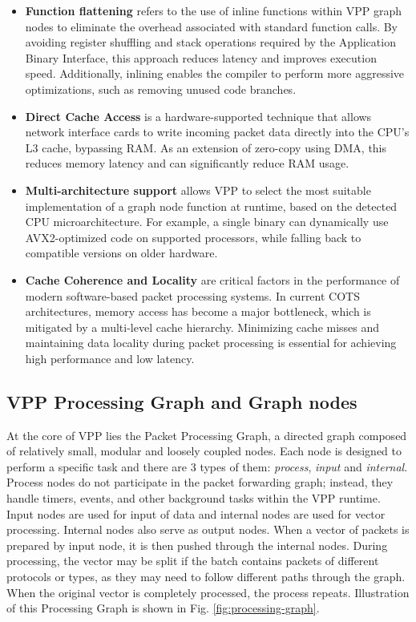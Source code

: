 \begin{itemize}
  \item \textbf{Function flattening} refers to the use of inline functions within VPP graph nodes to eliminate the overhead associated with standard function calls.
By avoiding register shuffling and stack operations required by the Application Binary Interface, this approach reduces latency and improves execution speed.
Additionally, inlining enables the compiler to perform more aggressive optimizations, such as removing unused code branches.~\cite{LINGUAGLOSSA}

  \item \textbf{Direct Cache Access} is a hardware-supported technique that allows network interface cards to write incoming packet data directly into the CPU’s L3 cache, bypassing RAM. 
As an extension of zero-copy using DMA, this reduces memory latency and can significantly reduce RAM usage.~\cite{LINGUAGLOSSA}

  \item \textbf{Multi-architecture support} allows VPP to select the most suitable implementation of a graph node function at runtime, based on the detected CPU microarchitecture.
For example, a single binary can dynamically use AVX2-optimized code on supported processors, while falling back to compatible versions on older hardware.~\cite{LINGUAGLOSSA}
  
  \item \textbf{Cache Coherence and Locality} are critical factors in the performance of modern software-based packet processing systems. 
In current COTS architectures, memory access has become a major bottleneck, which is mitigated by a multi-level cache hierarchy.
Minimizing cache misses and maintaining data locality during packet processing is essential for achieving high performance and low latency.~\cite{LINGUAGLOSSA}

\end{itemize}

\subsection{VPP Processing Graph and Graph nodes}
At the core of VPP lies the Packet Processing Graph, a directed graph composed of relatively small, modular and loosely coupled nodes. 
Each node is designed to perform a specific task and there are 3 types of them: \textit{process}, \textit{input} and \textit{internal}. 
Process nodes do not participate in the packet forwarding graph; instead, they handle timers, events, and other background tasks within the VPP runtime.
Input nodes are used for input of data and internal nodes are used for vector processing. Internal nodes also serve as output nodes. 
When a vector of packets is prepared by input node, it is then pushed through the internal nodes. 
During processing, the vector may be split if the batch contains packets of different protocols or types, as they may need to follow different paths through the graph.
When the original vector is completely processed, the process repeats.
Illustration of this Processing Graph is shown in Fig. \ref{fig:processing-graph}.

